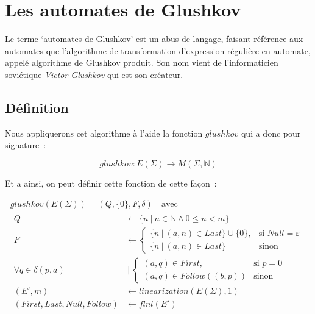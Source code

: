 \section{Les automates de Glushkov}\label{sec:glushkov}

Le terme `automates de Glushkov' est un abus de langage, faisant référence aux
automates que l'algorithme de transformation d'expression régulière en
automate, appelé algorithme de Glushkov produit. Son nom vient de
l'informaticien soviétique \textit{Victor Glushkov} qui est son créateur.

\subsection{Définition}

Nous appliquerons cet algorithme à l'aide la fonction \(glushkov\) qui a donc
pour signature~:

\[
    glushkov: E(\Sigma) \to M(\Sigma, \mathbb{N})
\]

Et a ainsi, on peut définir cette fonction de cette façon~:

\begin{gather}
    glushkov     (E(\Sigma)) = (Q, \{0\}, F, \delta) \quad \text{avec} \\
    \begin{align*}
        Q                                             & \leftarrow \{n ~|~ n \in \mathbb{N} \land 0 \leq n < m\}                                                                                               \\
        F                                             & \leftarrow \begin{cases} \{n ~|~ (a, n) \in Last\} \cup \{0\}, & \text{si } Null = \varepsilon \\ \{n ~|~ (a, n) \in Last\} & \text{sinon} \end{cases} \\
        \forall q                    \in \delta(p, a) & ~|~ \begin{cases} (a, q) \in First, & \text{si } p = 0 \\ (a, q) \in Follow((b, p)) & \text{sinon} \end{cases}                                         \\
        (E', m)                                       & \leftarrow linearization(E(\Sigma), 1)                                                                                                                 \\
        (First, Last, Null, Follow)                   & \leftarrow flnl(E')
    \end{align*}
\end{gather}

